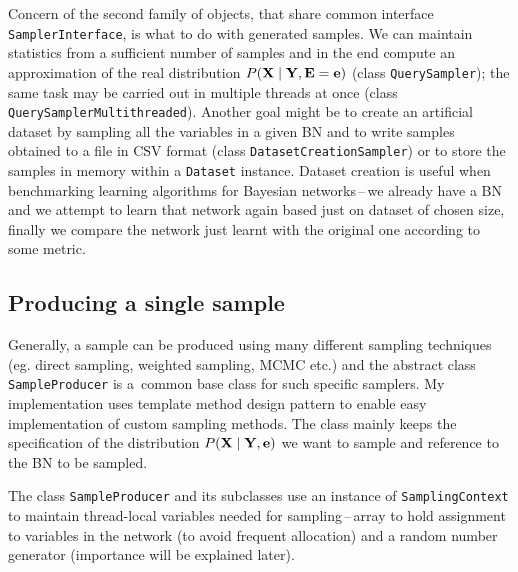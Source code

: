 \documentclass[english,cover]{fitthesis} %
\newcommand{\srccode}[1]{{\tt #1}}         %
\newcommand{\vars}[1]{{\bold{#1}}}         %
\begin{document}
Concern of the second family of objects, that share common interface \srccode{SamplerInterface}, is what to do with generated samples. We can maintain statistics from a sufficient number of samples and in the end compute an approximation of the real distribution $P(\vars{X} \mid \vars{Y}, \vars{E} = \vars{e})$ (class \srccode{QuerySampler}); the same task may be carried out in multiple threads at once (class \srccode{QuerySamplerMultithreaded}). Another goal might be to create an artificial dataset by sampling all the variables in a given BN and to write samples obtained to a file in CSV format (class \srccode{DatasetCreationSampler}) or to store the samples in memory within a \srccode{Dataset} instance. Dataset creation is useful when benchmarking learning algorithms for Bayesian networks\,--\,we already have a BN and we attempt to learn that network again based just on dataset of chosen size, finally we compare the network just learnt with the original one according to some metric.



\subsection{Producing a single sample}
Generally, a sample can be produced using many different sampling techniques (eg. direct sampling, weighted sampling, MCMC etc.) and the abstract class \srccode{SampleProducer} is a~common base class for such specific samplers. My implementation uses template method design pattern to enable easy implementation of custom sampling methods. The class mainly keeps the specification of the distribution $P(\vars{X} \mid \vars{Y}, \vars{e})$ we want to sample and reference to the BN to be sampled.

The class \srccode{SampleProducer} and its subclasses use an instance of \srccode{SamplingContext} to maintain thread-local variables needed for sampling\,--\,array to hold assignment to variables in the network (to avoid frequent allocation) and a random number generator (importance will be explained later).
\end{document}
